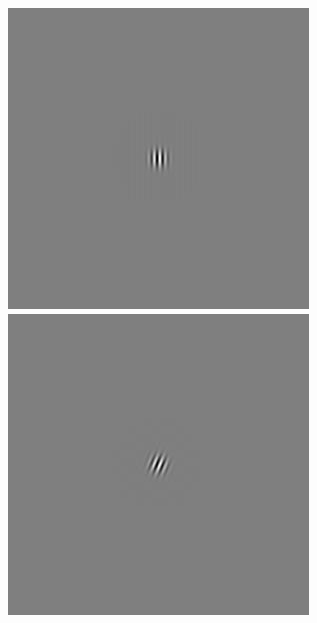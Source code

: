 \begin{figure}[ht]
 \begin{center}
 \includegraphics[width=\columnwidth/9]{ch4/figures/rGabor0_0.jpg}
 \includegraphics[width=\columnwidth/9]{ch4/figures/rGabor0_1.jpg}

\end{center}
\end{figure}

